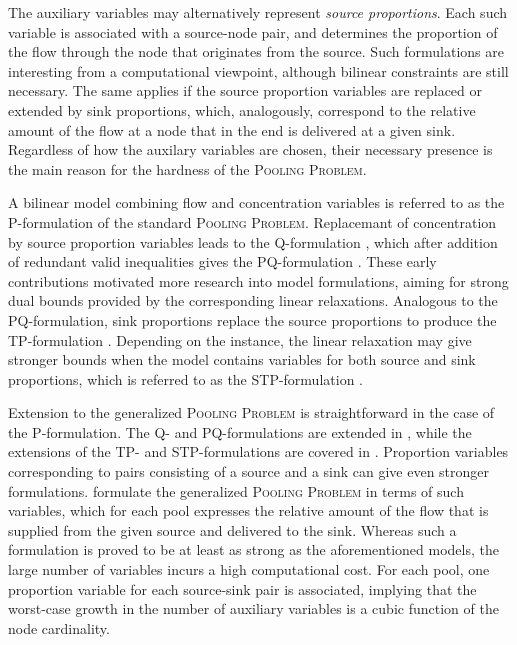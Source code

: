 \documentclass[pdflatex,sn-mathphys-num]{sn-jnl}%
\theoremstyle{thmstyleone}%
\begin{document}
The auxiliary variables may alternatively represent \emph{source proportions}.
Each such variable is associated with a source-node pair,
and determines the proportion of the flow through the node that originates from the source.
Such formulations are interesting from a computational viewpoint, although bilinear constraints are still necessary.
The same applies if the source proportion variables are replaced or extended by sink proportions, 
which, analogously, correspond to the relative amount of the flow at a node that in the end is delivered at a given sink.
Regardless of how the auxilary variables are chosen,
their necessary presence is the main reason for the hardness of the \textsc{Pooling Problem}.

A bilinear model combining flow and concentration variables is referred to as the P-formulation \cite{haverly78} of the
standard \textsc{Pooling Problem}.
Replacemant of concentration by source proportion variables leads to the Q-formulation \cite{bental94},
which after addition of redundant valid inequalities gives the PQ-formulation \cite{sahinidis05}.
These early contributions motivated more research into model formulations,
aiming for strong dual bounds provided by the corresponding linear relaxations.
Analogous to the PQ-formulation, sink proportions replace the source proportions to produce the TP-formulation \cite{alfaki13a}.
Depending on the instance, the linear relaxation may give stronger bounds when the model contains variables for both source and sink proportions,
which is referred to as the STP-formulation \cite{alfaki13a}.

Extension to the generalized \textsc{Pooling Problem} is straightforward in the case of the P-formulation.
The Q- and PQ-formulations are extended in \cite{alfaki13b}, while the extensions of the TP- and STP-formulations 
are covered in \citep{boland16}.
Proportion variables corresponding to pairs consisting of a source and a sink can give even stronger formulations.
\citet{boland16} formulate the generalized \textsc{Pooling Problem} in terms of such variables,
which for each pool expresses the relative amount of the flow that is supplied from the given source and delivered to the sink.
Whereas such a formulation is proved to be at least as strong as the aforementioned models,
the large number of variables incurs a high computational cost.
For each pool, one proportion variable for each source-sink pair is associated,
implying that the worst-case growth in the number of auxiliary variables is a cubic function of the node cardinality.
\end{document}
